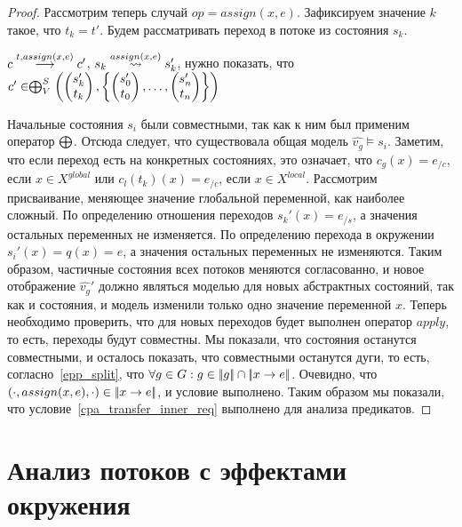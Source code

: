 \begin{proof}
Рассмотрим теперь случай $op = assign(x, e)$. Зафиксируем значение $k$ такое, что $t_k = t'$. Будем рассматривать переход в потоке из состояния $s_k$.

$c \stackrel{t, assign(x, e)}{\longrightarrow} c'$, $s_k \stackrel{assign(x, e)}{\leadsto} s_k'$, нужно показать, что 
$c' \in \mathrel{\bigoplus}^S_V
\left(
\begin{pmatrix}
s_k' \\
t_k 
\end{pmatrix},
\left\{
\begin{pmatrix}
s_0' \\
t_0 
\end{pmatrix},
\dots ,
\begin{pmatrix}
s_n' \\
t_n 
\end{pmatrix}
\right\}
\right)$

Начальные состояния $s_i$ были совместными, так как к ним был применим оператор $\mathrel{\bigoplus}$. 
Отсюда следует, что существовала общая модель $\hat{v_g} \models s_i$.
Заметим, что если переход есть на конкретных состояниях, это означает, что $c_g(x) = e_{/c}$, если $x \in X^{global}$ или $c_l(t_k)(x) = e_{/c}$, если $x \in X^{local}$.
Рассмотрим присваивание, меняющее значение глобальной переменной, как наиболее сложный.
По определению отношения переходов $s_k'(x) = e_{/s}$, а значения остальных переменных не изменяется.
По определению перехода в окружении $s_i'(x) = q(x) = e$, а значения остальных переменных не изменяются.
Таким образом, частичные состояния всех потоков меняются согласованно, и новое отображение $\hat{v_g}'$ должно являться моделью для новых абстрактных состояний, так как и состояния, и модель изменили только одно значение переменной $x$.
Теперь необходимо проверить, что для новых переходов будет выполнен оператор $apply$, то есть, переходы будут совместны.
Мы показали, что состояния останутся совместными, и осталось показать, что совместными останутся дуги, то есть, согласно~\ref{epp_split}, что $\forall g \in G: g \in \lvert \! \lvert g \rvert \! \rvert \cap \lvert \! \lvert x \to e \rvert \! \rvert$. 
Очевидно, что $(\cdot, assign(x, e), \cdot) \in \lvert \! \lvert x \to e \rvert \! \rvert$, и условие выполнено.
Таким образом мы показали, что условие~\ref{cpa_transfer_inner_req} выполнено для анализа предикатов.

\end{proof}

\section{Анализ потоков с эффектами окружения}
\label{sect_thread_analysis_ext}

